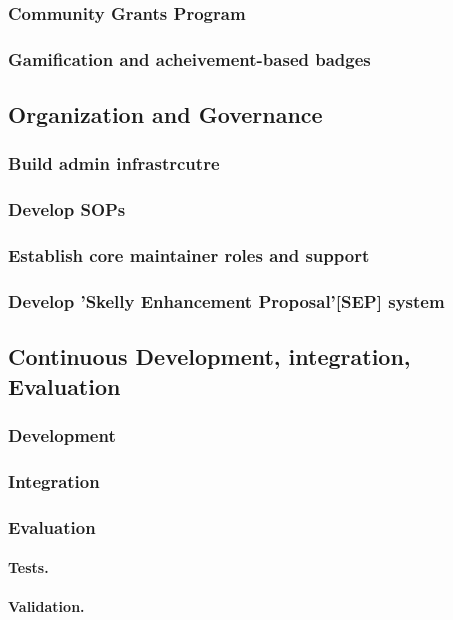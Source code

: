 \documentclass[11pt]{article}
\begin{document}
\subsubsection{Community Grants Program}
\subsubsection{Gamification and acheivement-based badges}

\subsection{Organization and Governance}
\subsubsection{Build admin infrastrcutre}
\subsubsection{Develop SOPs}
\subsubsection{Establish core maintainer roles and support}
\subsubsection{Develop 'Skelly Enhancement Proposal'[SEP] system}

\subsection{Continuous Development, integration, Evaluation}
\subsubsection{Development}
\subsubsection{Integration}
\subsubsection{Evaluation}
\paragraph{Tests.}
\paragraph{Validation.}
\end{document}
